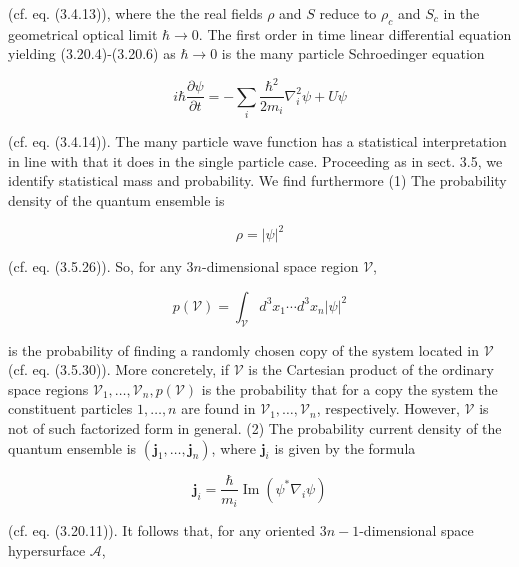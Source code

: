 \documentclass{article}
\begin{document}
(cf. eq. (3.4.13)), where the the real fields $\rho$ and $S$ reduce to $\rho_{c}$ and $S_{c}$ in the geometrical optical limit $\hbar \rightarrow 0$. The first order in time linear differential equation yielding (3.20.4)-(3.20.6) as $\hbar \rightarrow 0$ is the many particle Schroedinger equation
 
\begin{equation*}
i \hbar \frac{\partial \psi}{\partial t}=-\sum_{i} \frac{\hbar^{2}}{2 m_{i}} \nabla_{i}^{2} \psi+U \psi \tag{3.20.8}
\end{equation*}
 
(cf. eq. (3.4.14)). The many particle wave function has a statistical interpretation in line with that it does in the single particle case. Proceeding as in sect. 3.5, we identify statistical mass and probability. We find furthermore
(1) The probability density of the quantum ensemble is
 
\begin{equation*}
\rho=|\psi|^{2} \tag{3.20.9}
\end{equation*}
 
(cf. eq. (3.5.26)). So, for any $3 n$-dimensional space region $\mathcal{V}$,
 
\begin{equation*}
p(\mathcal{V})=\int_{\mathcal{V}} d^{3} x_{1} \cdots d^{3} x_{n}|\psi|^{2} \tag{3.20.10}
\end{equation*}
 
is the probability of finding a randomly chosen copy of the system located in $\mathcal{V}$
(cf. eq. (3.5.30)). More concretely, if $\mathcal{V}$ is the Cartesian product of the ordinary space regions $\mathcal{V}_{1}, \ldots, \mathcal{V}_{n}, p(\mathcal{V})$ is the probability that for a copy the system the constituent particles $1, \ldots, n$ are found in $\mathcal{V}_{1}, \ldots, \mathcal{V}_{n}$, respectively. However, $\mathcal{V}$ is not of such factorized form in general.
(2) The probability current density of the quantum ensemble is $\left(\boldsymbol{j}_{1}, \ldots, \boldsymbol{j}_{n}\right)$, where $\boldsymbol{j}_{i}$ is given by the formula
 
\begin{equation*}
\boldsymbol{j}_{i}=\frac{\hbar}{m_{i}} \operatorname{Im}\left(\psi^{*} \nabla_{i} \psi\right) \tag{3.20.11}
\end{equation*}
 
(cf. eq. (3.20.11)). It follows that, for any oriented $3 n-1$-dimensional space hypersurface $\mathcal{A}$,
 
\end{document}
